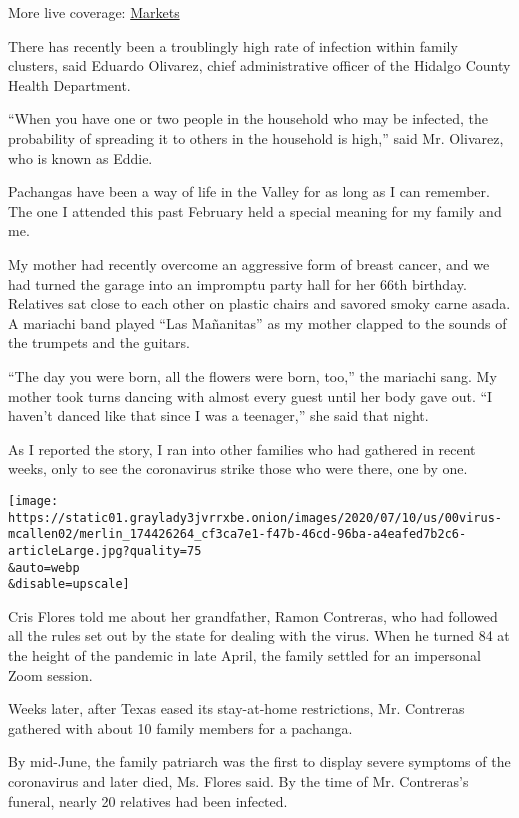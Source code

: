 More live coverage:
\href{https://www.nytimes3xbfgragh.onion/live/2020/08/04/business/stock-market-today-coronavirus?action=click\&pgtype=Article\&state=default\&region=MAIN_CONTENT_1\&context=storylines_live_updates}{Markets}

There has recently been a troublingly high rate of infection within
family clusters, said Eduardo Olivarez, chief administrative officer of
the Hidalgo County Health Department.

``When you have one or two people in the household who may be infected,
the probability of spreading it to others in the household is high,''
said Mr. Olivarez, who is known as Eddie.

Pachangas have been a way of life in the Valley for as long as I can
remember. The one I attended this past February held a special meaning
for my family and me.

My mother had recently overcome an aggressive form of breast cancer, and
we had turned the garage into an impromptu party hall for her 66th
birthday. Relatives sat close to each other on plastic chairs and
savored smoky carne asada. A mariachi band played ``Las Mañanitas'' as
my mother clapped to the sounds of the trumpets and the guitars.

``The day you were born, all the flowers were born, too,'' the mariachi
sang. My mother took turns dancing with almost every guest until her
body gave out. ``I haven't danced like that since I was a teenager,''
she said that night.

As I reported the story, I ran into other families who had gathered in
recent weeks, only to see the coronavirus strike those who were there,
one by one.

\texttt{[image: https://static01.graylady3jvrrxbe.onion/images/2020/07/10/us/00virus-mcallen02/merlin\_174426264\_cf3ca7e1-f47b-46cd-96ba-a4eafed7b2c6-articleLarge.jpg?quality=75\\\&auto=webp\\\&disable=upscale]}

Cris Flores told me about her grandfather, Ramon Contreras, who had
followed all the rules set out by the state for dealing with the virus.
When he turned 84 at the height of the pandemic in late April, the
family settled for an impersonal Zoom session.

Weeks later, after Texas eased its stay-at-home restrictions, Mr.
Contreras gathered with about 10 family members for a pachanga.

By mid-June, the family patriarch was the first to display severe
symptoms of the coronavirus and later died, Ms. Flores said. By the time
of Mr. Contreras's funeral, nearly 20 relatives had been infected.

